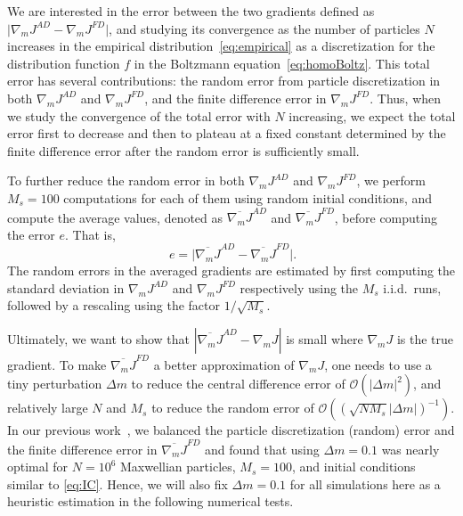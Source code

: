 \documentclass[12pt,nopreprintline]{elsarticle}
\begin{document}
We are interested in the error between the two gradients defined as $\big|\nabla_m J^{AD} - \nabla_m J^{FD}\big|$, and studying its convergence as the number of particles $N$ increases in the empirical distribution~\eqref{eq:empirical} as a discretization for the distribution function $f$ in the Boltzmann equation~\eqref{eq:homoBoltz}. 
This total error has several contributions: the random error from particle discretization in both $\nabla_m J^{AD}$ and $\nabla_m J^{FD}$, and the finite difference error in $\nabla_m J^{FD}$. Thus, when we study the convergence of the total error with $N$ increasing, we expect the total error first to decrease and then to plateau at a fixed constant determined by the finite difference error after the random error is sufficiently small. 

To further reduce the random error in both $\nabla_m J^{AD}$ and $\nabla_m J^{FD}$, we perform $M_s=100$ computations for each of them using random initial conditions, and compute the average values, denoted as $\overline{\nabla_m J}^{AD}$ and $\overline{\nabla_m J}^{FD}$,  before computing the error $e$.  That is,
\begin{equation}~\label{eq:error}
e=\big|\overline{ \nabla_m J}^{AD} - \overline{ \nabla_m J}^{FD}\big|.
\end{equation}
The random errors in the averaged gradients are estimated by first computing the standard deviation in $\nabla_m J^{AD}$ and $\nabla_m J^{FD}$ respectively using the $M_s$ i.i.d.~runs,  followed by a rescaling using the factor $1/\sqrt{M_s}$.  

Ultimately, we want to show that $| \overline{\nabla_m J}^{AD} - \nabla_m J|$ is small where $\nabla_m J$ is the true gradient.  To make $\overline{\nabla_m J}^{FD}$ a better approximation of $\nabla_m J$,  one needs to use a tiny perturbation $\Delta m$ to reduce the central difference error of $\mathcal{O}(|\Delta m|^2)$, and relatively large $N$ and $M_s$ to reduce the random error of $\mathcal{O}((\sqrt{N M_s} |\Delta m|)^{-1} )$.  In our previous work~\cite{caflisch2021adjoint}, we balanced the particle discretization (random) error and the finite difference error in $\overline{\nabla_m J}^{FD}$ and found that using $\Delta m=0.1$ was nearly optimal for $N=10^6$ Maxwellian particles, $M_s=100$, and initial conditions similar to \eqref{eq:IC}. Hence, we will also fix $\Delta m=0.1$ for all simulations here as a heuristic estimation in the following numerical tests.
\end{document}
